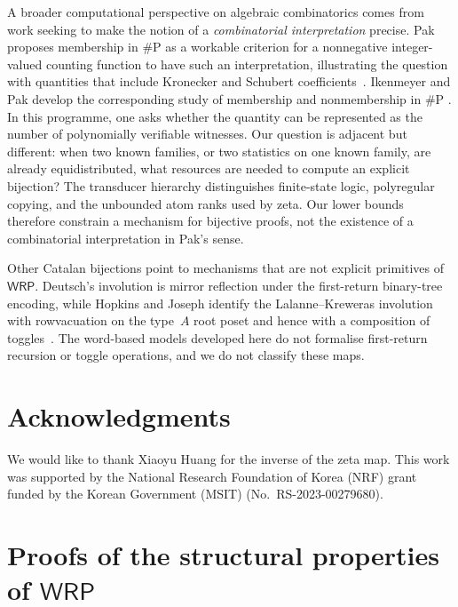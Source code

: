 \documentclass[11pt]{article}
\theoremstyle{definition}
\newcommand{\WRP}{\mathsf{WRP}}
\begin{document}
A broader computational perspective on algebraic combinatorics comes from
work seeking to make the notion of a \emph{combinatorial interpretation}
precise.  Pak proposes membership in $\#\mathrm{P}$ as a workable criterion for
a nonnegative integer-valued counting function to have such an interpretation,
illustrating the question with quantities that include Kronecker and Schubert
coefficients~\cite{Pak2024WhatIs}.  Ikenmeyer and Pak develop the corresponding
study of membership and nonmembership in $\#\mathrm{P}$
\cite{IkenmeyerPak2022}.  In this programme, one asks whether the quantity can
be represented as the number of polynomially verifiable witnesses.  Our
question is adjacent but different: when two known families, or two statistics
on one known family, are already equidistributed, what resources are needed to
compute an explicit bijection?  The transducer hierarchy distinguishes
finite-state logic, polyregular copying, and the unbounded atom ranks used by
zeta.  Our lower bounds therefore constrain a mechanism for bijective proofs,
not the existence of a combinatorial interpretation in Pak's sense.

Other Catalan bijections point to mechanisms that are not explicit primitives
of $\WRP$.  Deutsch's involution is mirror reflection under the first-return
binary-tree encoding, while Hopkins and Joseph identify the
Lalanne--Kreweras involution with rowvacuation on the type~$A$ root poset and
hence with a composition of toggles~\cite{Deutsch1999,HopkinsJoseph2022}.  The
word-based models developed here do not formalise first-return recursion or
toggle operations, and we do not classify these maps.

\section*{Acknowledgments}
We would like to thank Xiaoyu Huang for the inverse of the zeta map.
This work was supported by the National Research Foundation of Korea (NRF)
grant funded by the Korean Government (MSIT) (No.~RS-2023-00279680).




\clearpage
\appendix
\section[Proofs of the structural properties of WRP]{Proofs of the structural properties of $\WRP$}
\label{app:wrp-structural-proofs}
\end{document}
